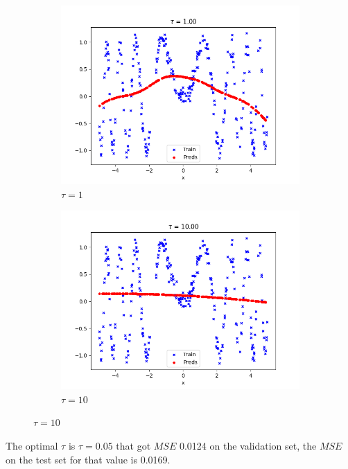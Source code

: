 \begin{answer}
\begin{figure}[H]
  \begin{subfigure}[b]{0.48\textwidth}
    \includegraphics[width=\textwidth]{lwr/tau=1.0.png}
    \caption*{\(\tau = 1\)}
  \end{subfigure}
  \hfill
  \begin{subfigure}[b]{0.48\textwidth}
    \includegraphics[width=\textwidth]{lwr/tau=10.0.png}
    \caption*{\(\tau = 10\)}
  \end{subfigure}
\end{figure}

The optimal $\tau$ is $\tau = 0.05$ that got $MSE$ 0.0124 on the validation set, the $MSE$ on the test set for that value is 0.0169.

\end{answer}
